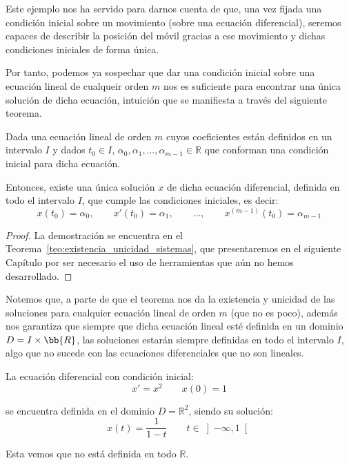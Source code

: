 Este ejemplo nos ha servido para darnos cuenta de que, una vez fijada una condición inicial sobre un movimiento (sobre una ecuación diferencial), seremos capaces de describir la posición del móvil gracias a ese movimiento y dichas condiciones iniciales de forma única.

Por tanto, podemos ya sospechar que dar una condición inicial sobre una ecuación lineal de cualqueir orden $m$ nos es suficiente para encontrar una única solución de dicha ecuación, intuición que se manifiesta a través del siguiente teorema.

\begin{teo}\label{teo:existencia_unicidad}
    Dada una ecuación lineal de orden $m$ cuyos coeficientes están definidos en un intervalo $I$ y dados $t_0\in I$, $\alpha_0,\alpha_1,\ldots,\alpha_{m-1}\in \mathbb{R}$ que conforman una condición inicial para dicha ecuación.

    Entonces, existe una única solución $x$ de dicha ecuación diferencial, definida en todo el intervalo $I$, que cumple las condiciones iniciales, es decir:
    \begin{equation*}
        x(t_0) = \alpha_0, \qquad x'(t_0) = \alpha_1,\qquad  \ldots, \qquad  x^{(m-1)}(t_0) = \alpha_{m-1}
    \end{equation*}
    \begin{proof}
        La demostración se encuentra en el Teorema~\ref{teo:existencia_unicidad_sistemas}, que presentaremos en el siguiente Capítulo por ser necesario el uso de herramientas que aún no hemos desarrollado.
    \end{proof}
\end{teo}

Notemos que, a parte de que el teorema nos da la existencia y unicidad de las soluciones para cualquier ecuación lineal de orden $m$ (que no es poco), además nos garantiza que siempre que dicha ecuación lineal esté definida en un dominio $D=I\times \bb{R}$, las soluciones estarán siempre definidas en todo el intervalo $I$, algo que no sucede con las ecuaciones diferenciales que no son lineales.

\begin{ejemplo}
    La ecuación diferencial con condición inicial:
    \begin{equation*}
        x' = x^2 \qquad x(0) = 1
    \end{equation*}

    se encuentra definida en el dominio $D=\mathbb{R}^2$, siendo su solución:
    \begin{equation*}
        x(t) = \dfrac{1}{1-t} \qquad t\in \left]-\infty,1\right[
    \end{equation*}

    Esta vemos que no está definida en todo $\mathbb{R}$.
\end{ejemplo}


